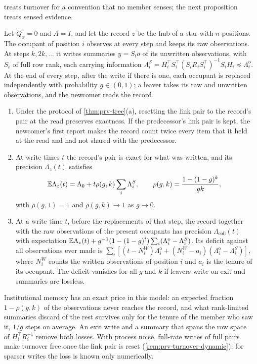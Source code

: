 treats turnover for a convention that no member senses; the next proposition treats sensed evidence.

\begin{proposition}[Turnover]\label{prop:prv-turnover}
Let $Q_x=0$ and $A=I$, and let the record $z$ be the hub of a star with $n$ positions. The occupant of position $i$ observes at every step and keeps its raw observations. At steps $k,2k,\dots$ it writes summaries $y=S_io$ of its unwritten observations, with $S_i$ of full row rank, each carrying information $\Lambda^S_i=H_i^\top S_i^\top(S_iR_iS_i^\top)^{-1}S_iH_i\preceq\Lambda^{\mathrm o}_i$. At the end of every step, after the write if there is one, each occupant is replaced independently with probability $g\in(0,1)$; a leaver takes its raw and unwritten observations, and the newcomer reads the record.
\begin{enumerate}
\item[(a)] Under the protocol of \cref{thm:prv-tree}(a), resetting the link pair to the record's pair at the read preserves exactness. If the predecessor's link pair is kept, the newcomer's first report makes the record count twice every item that it held at the read and had not shared with the predecessor.
\item[(b)] At write times $t$ the record's pair is exact for what was written, and its precision $\Lambda_z(t)$ satisfies
\begin{equation}\label{eq:prv-rho}
\mathbb{E}\Lambda_z(t)=\Lambda_0+t\rho(g,k)\sum_i\Lambda^S_i,\qquad\rho(g,k)=\frac{1-(1-g)^k}{gk},
\end{equation}
with $\rho(g,1)=1$ and $\rho(g,k)\to1$ as $g\to0$.
\item[(c)] At a write time $t$, before the replacements of that step, the record together with the raw observations of the present occupants has precision $\Lambda_{\mathrm{coll}}(t)$ with expectation $\mathbb{E}\Lambda_z(t)+g^{-1}(1-(1-g)^t)\sum_i(\Lambda^{\mathrm o}_i-\Lambda^S_i)$. Its deficit against all observations ever made is $\sum_i[(t-N^W_i)\Lambda^{\mathrm o}_i+(N^W_i-a_i)(\Lambda^{\mathrm o}_i-\Lambda^S_i)]$, where $N^W_i$ counts the written observations of position $i$ and $a_i$ is the tenure of its occupant. The deficit vanishes for all $g$ and $k$ if leavers write on exit and summaries are lossless.
\end{enumerate}
\end{proposition}

Institutional memory has an exact price in this model: an expected fraction $1-\rho(g,k)$ of the observations never reaches the record, and what rank-limited summaries discard of the rest survives only for the tenure of the member who saw it, $1/g$ steps on average. An exit write and a summary that spans the row space of $H_i^\top R_i^{-1}$ remove both losses. With process noise, full-rate writes of full pairs make turnover free once the link pair is reset (\cref{rem:prv-turnover-dynamic}); for sparser writes the loss is known only numerically.

